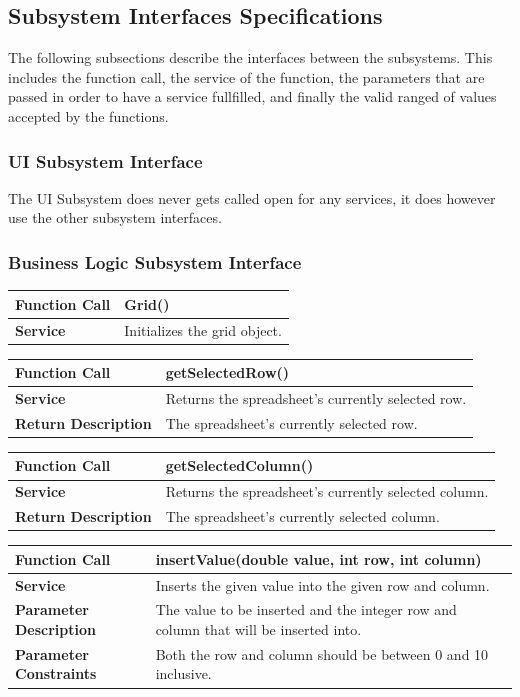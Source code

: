 \documentclass[12pt]{article}
\begin{document}
\subsection{Subsystem Interfaces Specifications}
The following subsections describe the interfaces between the subsystems. This includes the function call, the service of the function, the parameters that are passed in order to have a service fullfilled, and finally the valid ranged of values accepted by the functions.
\subsubsection{UI Subsystem Interface}
The UI Subsystem does never gets called open for any services, it does however use the other subsystem interfaces.
\subsubsection{Business Logic Subsystem Interface}

\begin{tabular}{|p{4.75cm}|p{11.25cm}|}
\hline
\textbf{Function Call} & Grid()
\\\hline
\textbf{Service} & Initializes the grid object.
\\\hline
\end{tabular}

\begin{tabular}{|p{4.75cm}|p{11.25cm}|}
\hline
\textbf{Function Call} & getSelectedRow()
\\\hline
\textbf{Service} & Returns the spreadsheet's currently selected row.
\\\hline
\textbf{Return Description} & The spreadsheet's currently selected row.
\\\hline
\end{tabular}

\begin{tabular}{|p{4.75cm}|p{11.25cm}|}
\hline
\textbf{Function Call} & getSelectedColumn()
\\\hline
\textbf{Service} & Returns the spreadsheet's currently selected column.
\\\hline
\textbf{Return Description} & The spreadsheet's currently selected column.
\\\hline
\end{tabular}

\begin{tabular}{|p{4.75cm}|p{11.25cm}|}
\hline
\textbf{Function Call} & insertValue(double value, int row, int column)
\\\hline
\textbf{Service} & Inserts the given value into the given row and column.
\\\hline
\textbf{Parameter Description} & The value to be inserted and the integer row and column that will be inserted into.
\\\hline
\textbf{Parameter Constraints} & Both the row and column should be between 0 and 10 inclusive.
\\\hline
\end{tabular}
\end{document}
